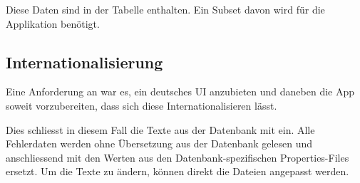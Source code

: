 Diese Daten sind in der Tabelle  enthalten.
Ein Subset davon wird für die Applikation benötigt.

\subsection{Internationalisierung}
\label{datenquellen-internationalisierung}
Eine Anforderung an \kort{} war es, ein deutsches UI anzubieten und daneben die App soweit vorzubereiten, dass sich diese Internationalisieren lässt.

Dies schliesst in diesem Fall die Texte aus der Datenbank mit ein.
Alle Fehlerdaten werden ohne Übersetzung aus der Datenbank gelesen und anschliessend mit den Werten aus den Datenbank-spezifischen Properties-Files ersetzt.
Um die Texte zu ändern, können direkt die Dateien angepasst werden.
